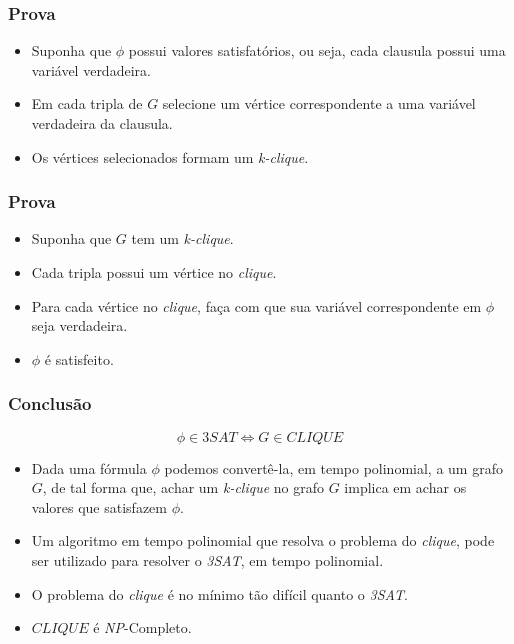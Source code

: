 \documentclass[]{beamer}
\begin{document}
\begin{frame}
	\frametitle{Prova}


	\begin{itemize}[<+->]
		\item Suponha que $\phi$ possui valores satisfatórios, ou seja, cada
			clausula possui uma variável verdadeira.
		\item Em cada tripla de $G$ selecione um vértice correspondente a uma
			variável verdadeira da clausula.
		\item Os vértices selecionados formam um \textit{k-clique}.
	\end{itemize}

\end{frame}

\begin{frame}
	\frametitle{Prova}


	\begin{itemize}[<+->]
		\item Suponha que $G$ tem um \textit{k-clique}.
		\item Cada tripla possui um vértice no \textit{clique}.
		\item Para cada vértice no \textit{clique}, faça com que sua variável
			correspondente em $\phi$ seja verdadeira.
		\item $\phi$ é satisfeito.
	\end{itemize}

\end{frame}

\begin{frame}
	\frametitle{Conclusão}

	$$\phi \in 3SAT \iff G \in CLIQUE$$

	\begin{itemize}[<+->]
		\item Dada uma fórmula $\phi$ podemos convertê-la, em tempo polinomial,
			a um grafo $G$, de tal forma que, achar um \textit{k-clique} no
			grafo $G$ implica em achar os valores que satisfazem $\phi$.
		\item Um algoritmo em tempo polinomial que resolva o problema do
			\textit{clique}, pode ser utilizado para resolver o \textit{3SAT},
			em tempo polinomial.
		\item O problema do \textit{clique} é no mínimo tão difícil quanto o
			\textit{3SAT}.
		\item $CLIQUE$ é \textit{NP}-Completo.
	\end{itemize}

\end{frame}
\end{document}
